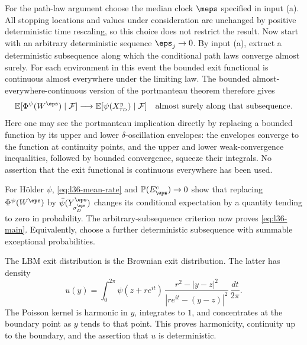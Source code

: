 For the path-law argument choose the median clock $\meps$
specified in input (a). All stopping locations and values
under consideration are unchanged by positive deterministic
time rescaling, so this choice does not restrict the result.
Now start with an arbitrary deterministic sequence
$\eps_j\to0$. By input (a), extract a deterministic subsequence
along which the conditional path laws converge almost surely.
For each environment in this event the bounded exit functional
is continuous almost everywhere under the limiting law.
The bounded almost-everywhere-continuous version of the
portmanteau theorem therefore gives
\[
 \mathbb{E}[\Phi^\psi(W^\eps)\mid\mathcal F]
 \longrightarrow\mathbb{E}[\psi(X^y_{\tau_D})\mid\mathcal F]
 \quad\text{almost surely along that subsequence}.
\]
Here one may see the portmanteau implication directly by replacing a
bounded function by its upper and lower $\delta$-oscillation
envelopes: the envelopes converge to the function at continuity
points, and the upper and lower weak-convergence inequalities,
followed by bounded convergence, squeeze their integrals.
No assertion that the exit functional is continuous everywhere
has been used.

For H\"older $\psi$, \eqref{eq:l36-mean-rate} and
$\mathbb{P}(E_\eps^c)\to0$ show that replacing
$\Phi^\psi(W^\eps)$ by $\bar\psi(Y^\eps_{\sigma_D^\eps})$
changes its conditional expectation by a quantity tending to
zero in probability. The arbitrary-subsequence criterion now
proves \eqref{eq:l36-main}. Equivalently, choose a further
deterministic subsequence with summable exceptional probabilities.

The LBM exit distribution is the Brownian exit distribution.
The latter has density
\[
 u(y)=\int_0^{2\pi}
 \psi(z+re^{it})\,
 \frac{r^2-|y-z|^2}{|re^{it}-(y-z)|^2}\,\frac{dt}{2\pi}.
\]
The Poisson kernel is harmonic in $y$, integrates to $1$, and
concentrates at the boundary point as $y$ tends to that point.
This proves harmonicity, continuity up to the boundary, and the
assertion that $u$ is deterministic.

